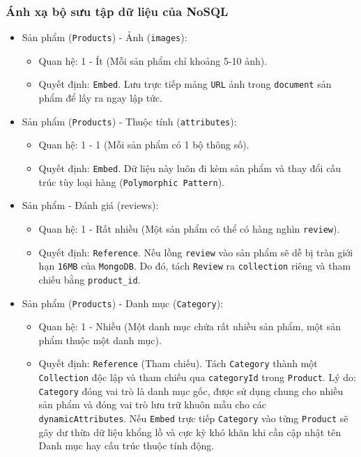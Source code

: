 \subsubsection{Ánh xạ bộ sưu tập dữ liệu của NoSQL}
\begin{itemize}[label=$\circ$]
    \item Sản phẩm (\texttt{Products}) - Ảnh (\texttt{images}):
    \begin{itemize}[label=\textbullet]
        \item Quan hệ: 1 - Ít (Mỗi sản phẩm chỉ khoảng 5-10 ảnh).
        \item Quyết định: \texttt{Embed}. Lưu trực tiếp mảng \texttt{URL} ảnh trong \texttt{document} sản phẩm để lấy ra ngay lập tức.
    \end{itemize}
    \item Sản phẩm (\texttt{Products}) - Thuộc tính (\texttt{attributes}):
    \begin{itemize}[label=\textbullet]
        \item Quan hệ: 1 - 1 (Mỗi sản phẩm có 1 bộ thông số).
        \item Quyết định: \texttt{Embed}. Dữ liệu này luôn đi kèm sản phẩm và thay đổi cấu trúc tùy loại hàng (\texttt{Polymorphic Pattern}).
    \end{itemize}
    \item Sản phẩm - Đánh giá (reviews):
    \begin{itemize}[label=\textbullet]
        \item Quan hệ: 1 - Rất nhiều (Một sản phẩm có thể có hàng nghìn \texttt{review}).
        \item Quyết định: \texttt{Reference}. Nếu lồng \texttt{review} vào sản phẩm sẽ dễ bị tràn giới hạn \texttt{16MB} của \texttt{MongoDB}. Do đó, tách \texttt{Review} ra \texttt{collection} riêng và tham chiếu bằng \texttt{product\_id}.
    \end{itemize}
    \item Sản phẩm (\texttt{Products}) - Danh mục (\texttt{Category}):
    \begin{itemize}[label=\textbullet]
        \item Quan hệ: 1 - Nhiều (Một danh mục chứa rất nhiều sản phẩm, một sản phẩm thuộc một danh mục).
        \item Quyết định: \texttt{Reference} (Tham chiếu). Tách \texttt{Category} thành một \texttt{Collection} độc lập và tham chiếu qua \texttt{categoryId} trong \texttt{Product}. Lý do: \texttt{Category} đóng vai trò là danh mục gốc, được sử dụng chung cho nhiều sản phẩm và đóng vai trò lưu trữ khuôn mẫu cho các \texttt{dynamicAttributes}. Nếu \texttt{Embed} trực tiếp \texttt{Category} vào từng \texttt{Product} sẽ gây dư thừa dữ liệu khổng lồ và cực kỳ khó khăn khi cần cập nhật tên Danh mục hay cấu trúc thuộc tính động.

\end{itemize}
\end{itemize}
